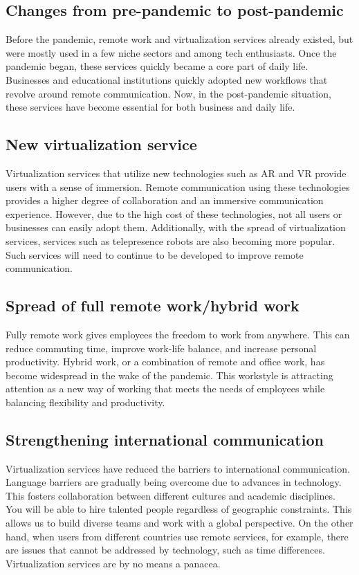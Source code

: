 \documentclass[12pt]{article}
\begin{document}
\subsection{Changes from pre-pandemic to post-pandemic}
Before the pandemic, remote work and virtualization services already existed,
but were mostly used in a few niche sectors and among tech enthusiasts. Once
the pandemic began, these services quickly became a core part of daily life.
Businesses and educational institutions quickly adopted new workflows that
revolve around remote communication. Now, in the post-pandemic situation, these
services have become essential for both business and daily life.

\subsection{New virtualization service}
Virtualization services that utilize new technologies such as AR and VR provide
users with a sense of immersion. Remote communication using these technologies
provides a higher degree of collaboration and an immersive communication
experience. However, due to the high cost of these technologies, not all users
or businesses can easily adopt them. Additionally, with the spread of
virtualization services, services such as telepresence robots are also becoming
more popular. Such services will need to continue to be developed to improve
remote communication.

\subsection{Spread of full remote work/hybrid work}
Fully remote work gives employees the freedom to work from anywhere. This can
reduce commuting time, improve work-life balance, and increase personal
productivity. Hybrid work, or a combination of remote and office work, has
become widespread in the wake of the pandemic. This workstyle is attracting
attention as a new way of working that meets the needs of employees while
balancing flexibility and productivity.

\subsection{Strengthening international communication}
Virtualization services have reduced the barriers to international
communication. Language barriers are gradually being overcome due to advances
in technology. This fosters collaboration between different cultures and
academic disciplines. You will be able to hire talented people regardless of
geographic constraints. This allows us to build diverse teams and work with a
global perspective. On the other hand, when users from different countries use
remote services, for example, there are issues that cannot be addressed by
technology, such as time differences. Virtualization services are by no means a
panacea.
\end{document}
